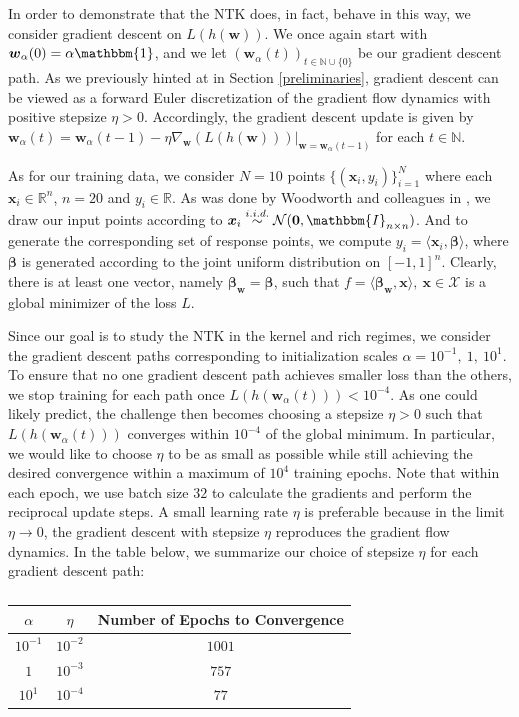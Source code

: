 \documentclass{article}
\begin{document}
In order to demonstrate that the NTK does, in fact, behave in this way, we consider gradient descent on $L(h(\boldsymbol{w}))$. We once again start with $\boldsymbol{w}_{\alpha}(0) = \alpha \mathbbm{1}$, and we let $(\boldsymbol{w}_{\alpha}(t))_{t \in \mathbb{N} \cup \{ 0\}}$ be our gradient descent path. As we previously hinted at in Section \ref{preliminaries}, gradient descent can be viewed as a forward Euler discretization of the gradient flow dynamics with positive stepsize $\eta > 0$. Accordingly, the gradient descent update is given by $\boldsymbol{w}_{\alpha}(t) = \boldsymbol{w}_{\alpha}(t-1) - \eta \nabla_{\boldsymbol{w}} (L(h(\boldsymbol{w})))|_{\boldsymbol{w} = \boldsymbol{w}_{\alpha}(t-1)}$ for each $t \in \mathbb{N}$.

As for our training data, we consider $N=10$ points $\{ (\boldsymbol{x}_i, y_i) \}_{i=1}^N$ where each $\boldsymbol{x}_i \in \mathbb{R}^{n}$, $n = 20$ and $y_i \in \mathbb{R}$. As was done by Woodworth and colleagues in \cite{woodworth2020kernel}, we draw our input points according to $\boldsymbol{x}_i \overset{i.i.d.}{\sim} \mathcal{N}(\boldsymbol{0}, \mathbbm{I}_{n \times n})$. And to generate the corresponding set of response points, we compute $y_i = \langle \boldsymbol{x}_i, \boldsymbol{\beta} \rangle$, where $\boldsymbol{\beta}$ is generated according to the joint uniform distribution on $[-1, 1]^n$. Clearly, there is at least one vector, namely $\boldsymbol{\beta}_{\boldsymbol{w}} = \boldsymbol{\beta}$, such that $f = \langle \boldsymbol{\beta}_{\boldsymbol{w}}, \boldsymbol{x} \rangle, \ \boldsymbol{x} \in \mathcal{X}$ is a global minimizer of the loss $L$.

Since our goal is to study the NTK in the kernel and rich regimes, we consider the gradient descent paths corresponding to initialization scales $\alpha = 10^{-1}, \ 1, \ 10^{1}$. To ensure that no one gradient descent path achieves smaller loss than the others, we stop training for each path once $L(h(\boldsymbol{w}_{\alpha}(t))) < 10^{-4}$. As one could likely predict, the challenge then becomes choosing a stepsize $\eta > 0$ such that $L(h(\boldsymbol{w}_{\alpha}(t)))$ converges within $10^{-4}$ of the global minimum. In particular, we would like to choose $\eta$ to be as small as possible while still achieving the desired convergence within a maximum of $10^4$ training epochs. Note that within each epoch, we use batch size $32$ to calculate the gradients and perform the reciprocal update steps. A small learning rate $\eta$ is preferable because in the limit $\eta \rightarrow 0$, the gradient descent with stepsize $\eta$ reproduces the gradient flow dynamics. In the table below, we summarize our choice of stepsize $\eta$ for each gradient descent path:
\begin{table}[H]
\centering
\begin{tabular}{ c|c|c } 
$\alpha$ & $\eta$ & Number of Epochs to Convergence \\
\hline
$10^{-1}$ & $10^{-2}$ & $1001$ \\ 
$1$ & $10^{-3}$ & $757$ \\
$10^1$ & $10^{-4}$ & $77$
\end{tabular}
\caption{}\label{table:NTK}
\end{table}
\end{document}

